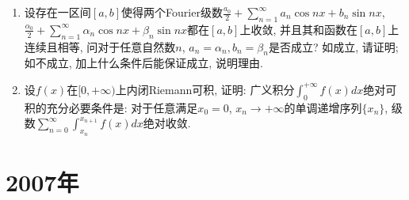 \documentclass[12pt,a4paper,openany]{book}
\begin{document}
\begin{enumerate}
\item 设存在一区间$[a, b]$使得两个Fourier级数$\displaystyle\frac{a_0}{2} + \sum\limits_{n=1}^{\infty}{a_n\cos{nx} + b_n\sin{nx}}$, $\displaystyle\frac{\alpha_0}{2} + \sum\limits_{n=1}^{\infty}{\alpha_n\cos{nx} + \beta_n\sin{nx}}$都在$[a, b]$上收敛, 并且其和函数在$[a, b]$上连续且相等, 问对于任意自然数$n$, $a_n = \alpha_n, b_n = \beta_n$是否成立? 如成立, 请证明; 如不成立, 加上什么条件后能保证成立, 说明理由.

\item 设$f(x)$在$[0, +\infty)$上内闭Riemann可积, 证明: 广义积分$\displaystyle\int_{0}^{+\infty}{f(x)dx}$绝对可积的充分必要条件是: 对于任意满足$x_0 = 0$, $x_n \rightarrow +\infty$的单调递增序列$\{x_n\}$, 级数$\displaystyle\sum\limits_{n=0}^{\infty}{\int_{x_n}^{x_{n+1}}{f(x)dx}}$绝对收敛.
\end{enumerate}

\section{2007年}
\end{document}
